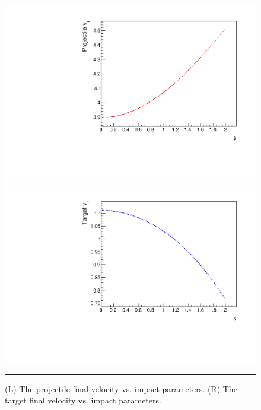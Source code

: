 \documentclass[aps,prl,floatfix,preprint,nofootinbib]{revtex4}
\begin{document}
\begin{figure}[h!]
  \includegraphics[width=.45\linewidth]{plots/trend_plots/pvf_vs_s.pdf}
  \includegraphics[width=.45\linewidth]{plots/trend_plots/tvf_vs_s.pdf}
                  {\par\nobreak\rule[9pt]{35em}{0.5pt}\vspace{-5mm}}
                  \caption{(L) The projectile final velocity vs. impact parameters. (R) The target final velocity vs. impact parameters.}
                  \label{fig:changing_s2}
\end{figure}
\end{document}
